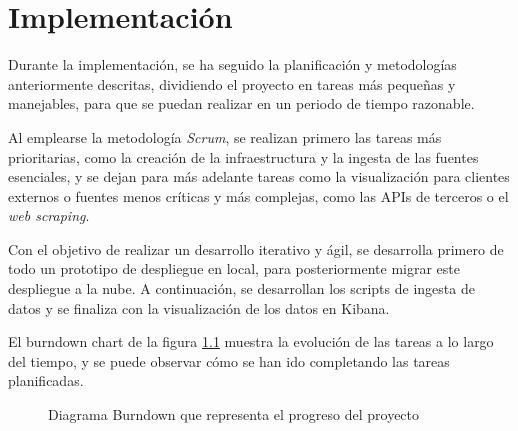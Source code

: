 \chapter{Implementación}
Durante la implementación, se ha seguido la planificación y metodologías
anteriormente descritas, dividiendo el proyecto en tareas más pequeñas y
manejables, para que se puedan realizar en un periodo de tiempo razonable.

Al emplearse la metodología \textit{Scrum}, se realizan primero las tareas más
prioritarias, como la creación de la infraestructura y la ingesta de las fuentes
esenciales, y se dejan para más adelante tareas como la visualización para
clientes externos o fuentes menos críticas y más complejas, como las APIs de
terceros o el \textit{web scraping}.

Con el objetivo de realizar un desarrollo iterativo y ágil, se desarrolla
primero de todo un prototipo de despliegue en local, para posteriormente
migrar este despliegue a la nube. A continuación, se desarrollan los scripts de
ingesta de datos y se finaliza con la visualización de los datos en Kibana.

El burndown chart de la figura \ref{fig:burndown} muestra la evolución de las
tareas a lo largo del tiempo, y se puede observar cómo se han ido completando
las tareas planificadas.

\begin{figure}[htbp]
	\centering
	\caption{Diagrama Burndown que representa el progreso del proyecto}
	\label{fig:burndown}
\end{figure}


